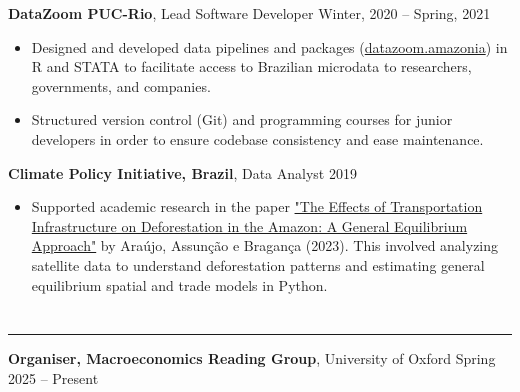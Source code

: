 \documentclass[letterpaper, 11pt]{article}
\begin{document}
\vspace{0.1cm}

\noindent
\textbf{DataZoom PUC-Rio}, Lead Software Developer \hfill Winter, 2020 -- Spring, 2021
\vspace{-0.2cm}
\begin{itemize}
	\item Designed and developed data pipelines and packages (\href{https://github.com/datazoompuc/datazoom.amazonia}{datazoom.amazonia}) in R and STATA to facilitate access to Brazilian microdata to researchers, governments, and companies.\vspace{-0.2cm}
	\item Structured version control (Git) and programming courses for junior developers in order to ensure codebase consistency and ease maintenance.
\end{itemize}

\vspace{0.1cm}

\noindent
\textbf{Climate Policy Initiative, Brazil}, Data Analyst \hfill 2019
\vspace{-0.2cm}
\begin{itemize}
	\item Supported academic research in the paper \href{https://rafaelcraraujo.github.io/assets/papers/Infrastructure_deforestation_GE.pdf}{"The Effects of Transportation Infrastructure on Deforestation in the Amazon: A General Equilibrium Approach"} by Ara\'ujo, Assun\c{c}\~ao e Bragan\c{c}a (2023). This involved analyzing satellite data to understand deforestation patterns and estimating general equilibrium spatial and trade models in Python.
\end{itemize}






\section*{\color{OxfordBlue}{Teaching \& Service}}

\vspace{-0.6cm}
\noindent\rule{\textwidth}{0.4pt}

\vspace{-0.0cm}

\noindent
\textbf{Organiser, Macroeconomics Reading Group}, University of Oxford \hfill Spring 2025 -- Present\\
\end{document}
